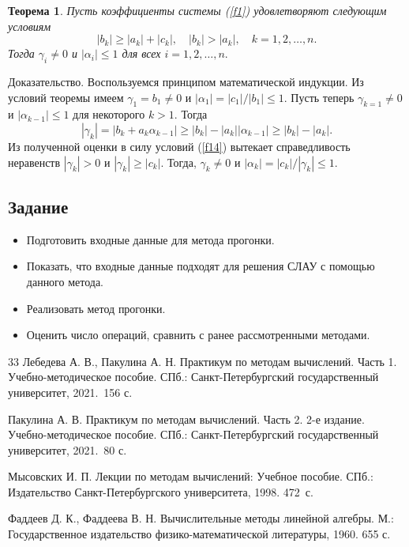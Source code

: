 \documentclass[12pt]{article}
\newtheorem{theorem}{Теорема}
\begin{document}
    \begin{theorem}
    Пусть коэффициенты системы (\ref{f1}) удовлетворяют следующим условиям
    \begin{equation}
        \left|b_k\right|\geqslant\left|a_k\right|+\left|c_k\right|,\quad \left|b_k\right|>\left|a_k\right|,\quad k=1,2,\ldots,n. \label{f14}
    \end{equation}
    Тогда $\gamma_i\neq 0$ и $\left|\alpha_i\right|\leqslant 1$ для всех $i=1,2,\ldots,n.$
    \end{theorem}

    Доказательство. Воспользуемся принципом математической индукции. Из условий теоремы имеем $\gamma_1=b_1\neq 0$ и $\left|\alpha_1\right|=\left|c_1\right|/\left|b_1\right|\leqslant 1$. Пусть теперь $\gamma_{k=1}\neq 0$ и $\left|\alpha_{k-1}\right|\leqslant 1$ для некоторого $k>1$. Тогда
    \begin{equation}
        \left|\gamma_k\right|=\left|b_k+a_k\alpha_{k-1}\right|\geqslant\left|b_k\right|-\left|a_k\right|\left|\alpha_{k-1}\right|\geqslant\left|b_k\right|-\left|a_k\right|.
    \end{equation}
    Из полученной оценки в силу условий (\ref{f14}) вытекает справедливость неравенств $\left|\gamma_k\right|>0$ и $\left|\gamma_k\right|\geqslant \left|c_k\right|$. Тогда, $\gamma_k\neq 0$ и $\left|\alpha_k\right|=\left|c_k\right|/\left|\gamma_k\right|\leqslant 1$.

    \subsection*{Задание}

    \begin{itemize}
    	\item Подготовить входные данные для метода прогонки.
    	\item Показать, что входные данные подходят для решения СЛАУ с помощью данного метода.
    	\item Реализовать метод прогонки.
    	\item Оценить число операций, сравнить с ранее рассмотренными методами.
    \end{itemize}

    \renewcommand{\bibname}{{Список литературы}}
    
    \begin{thebibliography}{33}
		Лебедева А. В., Пакулина А. Н. Практикум по методам вычислений. Часть 1. Учебно-методическое пособие. СПб.: Санкт-Петербургский государственный университет, 2021.~156 с.
		
		Пакулина А. В. Практикум по методам вычислений. Часть 2. 2-е издание. Учебно-методическое пособие. СПб.: Санкт-Петербургский государственный университет, 2021.~80 с.
		
		Мысовских И. П. Лекции по методам вычислений: Учебное пособие. СПб.: Издательство Санкт-Петербургского университета, 1998. 472~с.
		
		Фаддеев Д. К., Фаддеева В. Н. Вычислительные методы линейной алгебры. М.:  Государственное издательство физико-математической литературы, 1960. 655 с.
    \end{thebibliography}
\end{document}
